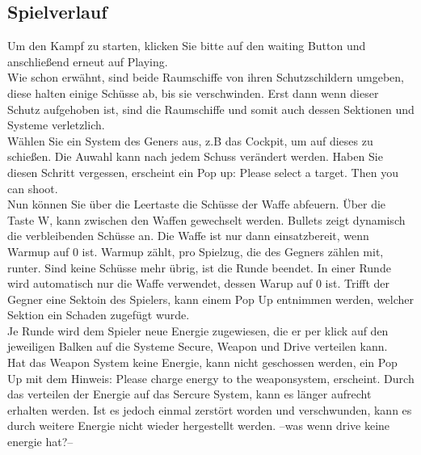 \documentclass[fontsize=12pt,paper=a4,twoside]{scrartcl}
\begin{document}
\subsection{Spielverlauf}

Um den Kampf zu starten, klicken Sie bitte auf den waiting Button und anschließend erneut
auf Playing.\\

Wie schon erwähnt, sind beide Raumschiffe von ihren Schutzschildern umgeben, diese halten einige 
Schüsse ab, bis sie verschwinden. Erst dann wenn dieser Schutz aufgehoben ist, sind die Raumschiffe und somit auch dessen Sektionen und Systeme verletzlich.\\

Wählen Sie ein System des Geners aus, z.B das Cockpit, um auf dieses zu schießen. Die Auwahl kann nach jedem Schuss verändert werden. Haben Sie diesen
Schritt vergessen, erscheint ein Pop up: Please select a target. Then you can shoot.\\

Nun können Sie über die Leertaste die Schüsse der Waffe abfeuern. Über die Taste W, kann zwischen den Waffen gewechselt werden.
Bullets zeigt dynamisch die verbleibenden Schüsse an. Die Waffe ist nur dann einsatzbereit, wenn Warmup auf 0 ist. Warmup zählt, pro Spielzug, die des Gegners zählen mit, runter. Sind keine Schüsse mehr übrig, ist die Runde beendet.
In einer Runde wird automatisch nur die Waffe verwendet, dessen Warup auf 0 ist.
Trifft der Gegner eine Sektoin des Spielers, kann einem Pop Up entnimmen werden, welcher Sektion ein Schaden zugefügt wurde.\\

Je Runde wird dem Spieler neue Energie zugewiesen, die er per klick auf den jeweiligen Balken auf die Systeme Secure, Weapon und Drive
verteilen kann.\\

Hat das Weapon System keine Energie, kann nicht geschossen werden, ein Pop Up mit dem Hinweis:
Please charge energy to the weaponsystem, erscheint.
Durch das verteilen der Energie auf das Sercure System, kann es länger aufrecht erhalten werden. Ist es jedoch einmal zerstört worden und verschwunden, kann es durch weitere Energie nicht wieder hergestellt werden. --was wenn drive keine energie hat?--\\
\end{document}
